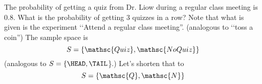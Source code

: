 The probability of getting a quiz from Dr. Liow during a regular
class meeting is 0.8.
What is the probability of getting 3 quizzes in a row?
Note that what is given is the experiment 
\lq\lq Attend a regular class meeting''.
(analogous to \lq\lq toss a coin'')
The sample space is
\[
S = \{\mathsc{Quiz}, \mathsc{NoQuiz}\}
\]
(analogous to $S= \{\HEAD, \TAIL$\}.)
Let's shorten that to 
\[
S = \{\mathsc{Q}, \mathsc{N}\}
\]
